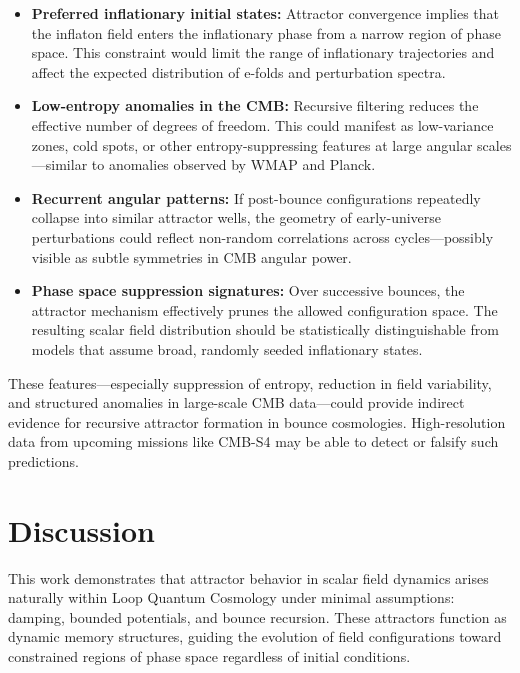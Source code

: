 \documentclass[12pt]{article}
\begin{document}
\begin{itemize}
  \item \textbf{Preferred inflationary initial states:} Attractor convergence implies that the inflaton field enters the inflationary phase from a narrow region of phase space. This constraint would limit the range of inflationary trajectories and affect the expected distribution of e-folds and perturbation spectra.

  \item \textbf{Low-entropy anomalies in the CMB:} Recursive filtering reduces the effective number of degrees of freedom. This could manifest as low-variance zones, cold spots, or other entropy-suppressing features at large angular scales—similar to anomalies observed by WMAP and Planck.

  \item \textbf{Recurrent angular patterns:} If post-bounce configurations repeatedly collapse into similar attractor wells, the geometry of early-universe perturbations could reflect non-random correlations across cycles—possibly visible as subtle symmetries in CMB angular power.

  \item \textbf{Phase space suppression signatures:} Over successive bounces, the attractor mechanism effectively prunes the allowed configuration space. The resulting scalar field distribution should be statistically distinguishable from models that assume broad, randomly seeded inflationary states.
\end{itemize}

These features—especially suppression of entropy, reduction in field variability, and structured anomalies in large-scale CMB data—could provide indirect evidence for recursive attractor formation in bounce cosmologies. High-resolution data from upcoming missions like CMB-S4 may be able to detect or falsify such predictions.

\section{Discussion}

This work demonstrates that attractor behavior in scalar field dynamics arises naturally within Loop Quantum Cosmology under minimal assumptions: damping, bounded potentials, and bounce recursion. These attractors function as dynamic memory structures, guiding the evolution of field configurations toward constrained regions of phase space regardless of initial conditions.
\end{document}
